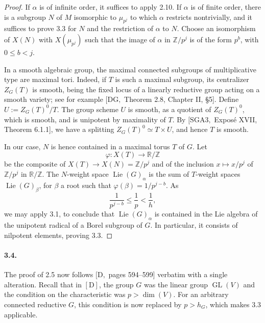 \documentclass[11pt]{article}
\newcommand{\Lie}{\operatorname{Lie}}
\newcommand{\GL}{\operatorname{GL}}
\begin{document}
\begin{proof}
If \(\alpha\) is of infinite order, it suffices to apply 2.10. If \(\alpha\) is of finite
order, there is a subgroup \(N\) of \(M\) isomorphic to \(\mu_{p^j}\) to which
\(\alpha\) restricts nontrivially, and it suffices to prove 3.3 for \(N\) and the
restriction of \(\alpha\) to \(N\). Choose an isomorphism of \(X(N)\) with
\(X(\mu_{p^j})\) such that the image of \(\alpha\) in \(\mathbb Z/p^j\) is of the form
\(p^b\), with \(0\le b<j\).

In a smooth algebraic group, the maximal connected subgroups of multiplicative type are
maximal tori. Indeed, if \(T\) is such a maximal subgroup, its centralizer \(Z_G(T)\) is
smooth, being the fixed locus of a linearly reductive group acting on a smooth variety;
see for example \([\mathrm{DG},\) Theorem 2.8, Chapter II, \S5]. Define
\(U:=Z_G(T)^0/T\). The group scheme \(U\) is smooth, as a quotient of \(Z_G(T)^0\),
which is smooth, and is unipotent by maximality of \(T\). By \([\mathrm{SGA3},\)
Exposé XVII, Theorem 6.1.1], we have a splitting
\(Z_G(T)^0\simeq T\times U\), and hence \(T\) is smooth.

In our case, \(N\) is hence contained in a maximal torus \(T\) of \(G\). Let
\begin{equation}
  \varphi:X(T)\longrightarrow \mathbb R/\mathbb Z
  \tag{3.3.1}
\end{equation}
be the composite of \(X(T)\to X(N)=\mathbb Z/p^j\) and of the inclusion
\(x\mapsto x/p^j\) of \(\mathbb Z/p^j\) in \(\mathbb R/\mathbb Z\). The \(N\)-weight
space \(\Lie(G)_\alpha\) is the sum of \(T\)-weight spaces \(\Lie(G)_\beta\), for
\(\beta\) a root such that \(\varphi(\beta)=1/p^{j-b}\). As
\[
  \frac1{p^{j-b}}\le \frac1p < \frac1h,
\]
we may apply 3.1, to conclude that \(\Lie(G)_\alpha\) is contained in the Lie algebra
of the unipotent radical of a Borel subgroup of \(G\). In particular, it consists of
nilpotent elements, proving 3.3.
\end{proof}

\paragraph{3.4.}
The proof of 2.5 now follows \([\mathrm D,\) pages 594--599] verbatim with a single
alteration. Recall that in \([\mathrm D]\), the group \(G\) was the linear group
\(\GL(V)\) and the condition on the characteristic was \(p>\dim(V)\). For an arbitrary
connected reductive \(G\), this condition is now replaced by \(p>h_G\), which makes 3.3
applicable.
\end{document}
